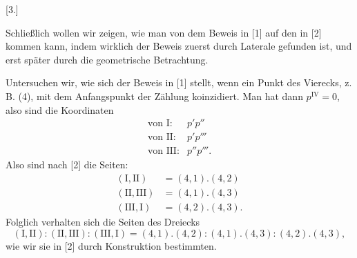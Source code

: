 
\begin{center}
[3.]
\end{center}

Schließlich wollen wir zeigen, wie man von dem Beweis in [1] auf den in [2] kommen kann, indem
wirklich der Beweis zuerst durch Laterale gefunden ist, und erst später durch die geometrische
Betrachtung.

Untersuchen wir, wie sich der Beweis in [1] stellt, wenn ein Punkt des Vierecks, z.\,B. (4), mit
dem Anfangspunkt der Zählung koinzidiert. Man hat dann $p^{\mathrm{IV}} = 0$, also sind die
Koordinaten
\[
\begin{array}{rl}
\text{von I:} & p'p'' \\
\text{von II:} & p'p''' \\
\text{von III:} & p''p'''.
\end{array}
\]
Also sind nach [2] die Seiten:
\[
\begin{array}{rl}
(\text{I}, \text{II}) & = (4,1) . (4,2) \\
(\text{II}, \text{III}) & = (4,1) . (4,3) \\
(\text{III}, \text{I}) & = (4,2) . (4,3).
\end{array}
\]
Folglich verhalten sich die Seiten des Dreiecks
\[
(\text{I}, \text{II}) : (\text{II}, \text{III}) : (\text{III}, \text{I}) = (4,1) . (4,2) :
(4,1) . (4,3) : (4,2) . (4,3),
\]
wie wir sie in [2] durch Konstruktion bestimmten.
